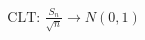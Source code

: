 \documentclass[preview]{standalone}
\begin{document}
\begin{align*}
\text{CLT: } \frac{S_n}{\sqrt{n}} \rightarrow N(0,1)
\end{align*}
\end{document}
